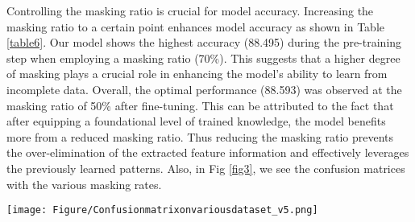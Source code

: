 


Controlling the masking ratio is crucial for model accuracy. Increasing the masking ratio to a certain point enhances model accuracy as shown in Table \ref{table6}. Our model shows the highest accuracy (88.495) during the pre-training step when employing a masking ratio (70\%). This suggests that a higher degree of masking plays a crucial role in enhancing the model's ability to learn from incomplete data. %
%
Overall, the optimal performance (88.593) was observed at the masking ratio of 50\% after fine-tuning. This can be attributed to the fact that after equipping a foundational level of trained knowledge, the model benefits more from a reduced masking ratio. Thus reducing the masking ratio prevents the over-elimination of the extracted feature information and effectively leverages the previously learned patterns. Also, in Fig \ref{fig3}, we see the confusion matrices with the various masking rates. 


%


\begin{figure*}[h]
\centerline{\texttt{[image: Figure/Confusionmatrixonvariousdataset\_v5.png]}}
\caption{\textbf{Confusion matrices for two datasets and masking ratio (M).}
}
\label{fig3}
\end{figure*}





 


